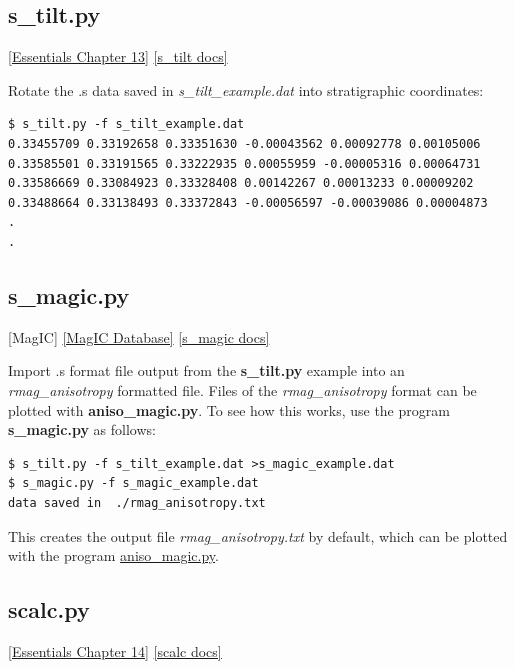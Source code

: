 \documentclass[11pt]{book}
\begin{document}
{\begin{verbatim}
\end{verbatim}


\subsection{s\_tilt.py}
\href{http://earthref.org/MAGIC/books/Tauxe/Essentials/WebBook3ch13.html#ch13}{[Essentials Chapter 13]}
\href{https://github.com/PmagPy/PmagPy/blob/master/programs/s_tilt.py}{[s\_tilt docs]}

Rotate the .s data saved in {\it s\_tilt\_example.dat} into stratigraphic coordinates:

\begin{verbatim}
$ s_tilt.py -f s_tilt_example.dat
0.33455709 0.33192658 0.33351630 -0.00043562 0.00092778 0.00105006
0.33585501 0.33191565 0.33222935 0.00055959 -0.00005316 0.00064731
0.33586669 0.33084923 0.33328408 0.00142267 0.00013233 0.00009202
0.33488664 0.33138493 0.33372843 -0.00056597 -0.00039086 0.00004873
.
.
\end{verbatim}


\subsection{s\_magic.py} [MagIC]
\href{#MagICDatabase}{[MagIC Database]}
\href{https://github.com/PmagPy/PmagPy/blob/master/programs/s_magic.py}{[s\_magic docs]}

Import .s format file output from the {\bf s\_tilt.py} example into an {\it rmag\_anisotropy} formatted file.  Files of the {\it rmag\_anisotropy} format can be plotted  with {\bf aniso\_magic.py}.   To see how this works,  use the program {\bf s\_magic.py} as follows:

\begin{verbatim}
$ s_tilt.py -f s_tilt_example.dat >s_magic_example.dat
$ s_magic.py -f s_magic_example.dat
data saved in  ./rmag_anisotropy.txt
\end{verbatim}

This creates the output file {\it rmag\_anisotropy.txt}  by default, which can be plotted with the program \href{#aniso_magic.py}{aniso\_magic.py}.



\subsection{scalc.py}
\href{http://earthref.org/MAGIC/books/Tauxe/Essentials/WebBook3ch14.html#ch14}{[Essentials Chapter 14]}
\href{https://github.com/PmagPy/PmagPy/blob/master/programs/scalc.py}{[scalc docs]}


}
\end{document}
